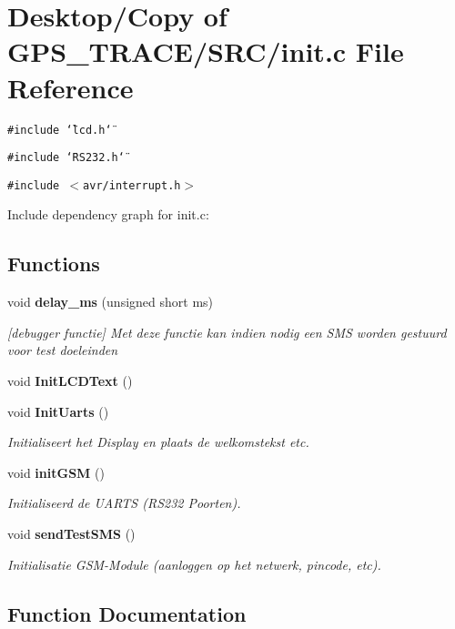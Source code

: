 \section{Desktop/Copy of GPS\_\-TRACE/SRC/init.c File Reference}
\label{init_8c}
{\tt \#include \char`\"{}lcd.h\char`\"{}}\par
{\tt \#include \char`\"{}RS232.h\char`\"{}}\par
{\tt \#include $<$avr/interrupt.h$>$}\par


Include dependency graph for init.c:\subsection*{Functions}
\begin{CompactItemize}
\item 
void {\bf delay\_\-ms} (unsigned short ms)
\begin{CompactList}\small\item\em [debugger functie] Met deze functie kan indien nodig een SMS worden gestuurd voor test doeleinden \item\end{CompactList}\item 
void {\bf InitLCDText} ()
\item 
void {\bf InitUarts} ()
\begin{CompactList}\small\item\em Initialiseert het Display en plaats de welkomstekst etc. \item\end{CompactList}\item 
void {\bf initGSM} ()
\begin{CompactList}\small\item\em Initialiseerd de UARTS (RS232 Poorten). \item\end{CompactList}\item 
void {\bf sendTestSMS} ()
\begin{CompactList}\small\item\em Initialisatie GSM-Module (aanloggen op het netwerk, pincode, etc). \item\end{CompactList}\end{CompactItemize}


\subsection{Function Documentation}
